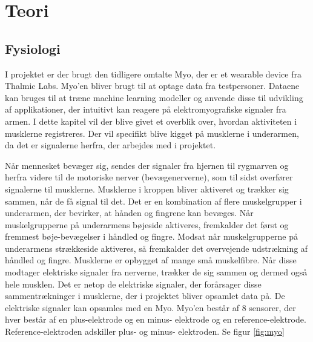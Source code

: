\thispagestyle{fancy}
\chapter{Teori}
\label{chp:teori}

\section{Fysiologi}
\label{sec:fysiologi}
I projektet er der brugt den tidligere omtalte Myo, der er et wearable device fra Thalmic Labs. Myo'en bliver brugt til at optage data fra testpersoner. Dataene kan bruges til at træne machine learning modeller og anvende disse til udvikling af applikationer, der intuitivt kan reagere på elektromyografiske signaler fra armen.
I dette kapitel vil der blive givet et overblik over, hvordan aktiviteten i musklerne registreres. Der vil specifikt blive kigget på musklerne i underarmen, da det er signalerne herfra, der arbejdes med i projektet.



Når mennesket bevæger sig, sendes der signaler fra hjernen til rygmarven og herfra videre til de motoriske nerver (bevægenerverne), som til sidst overfører signalerne til musklerne. Musklerne i kroppen bliver aktiveret og trækker sig sammen, når de få signal til det. Det er en kombination af flere muskelgrupper i underarmen, der bevirker, at hånden og fingrene kan bevæges. Når muskelgrupperne på underarmens bøjeside aktiveres, fremkalder det først og fremmest bøje-bevægelser i håndled og fingre. Modsat når muskelgrupperne på underarmens strækkeside aktiveres, så fremkalder det overvejende udstrækning af håndled og fingre. Musklerne er opbygget af mange små muskelfibre. Når disse modtager elektriske signaler fra nerverne, trækker de sig sammen og dermed også hele musklen. Det er netop de elektriske signaler, der forårsager disse sammentrækninger i musklerne, der i projektet bliver opsamlet data på. De elektriske signaler kan opsamles med en Myo. Myo'en består af 8 sensorer, der hver består af en plus-elektrode og en minus- elektrode og en reference-elektrode. Reference-elektroden adskiller plus- og minus- elektroden. Se figur \ref{fig:myo}

